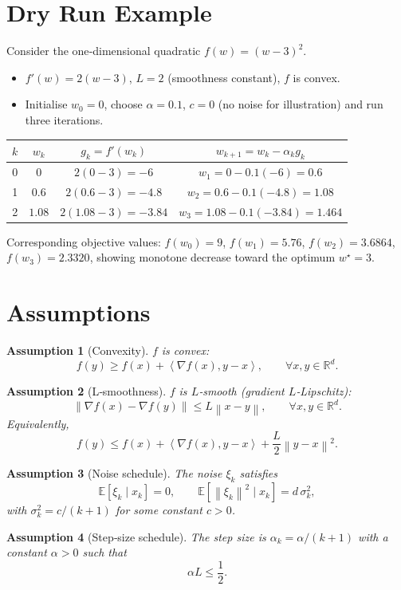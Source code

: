 \documentclass{article}
\newtheorem{assumption}{Assumption}
\newcommand{\E}{\mathbb{E}}
\newcommand{\R}{\mathbb{R}}
\newcommand{\norm}[1]{\left\lVert #1\right\rVert}
\newcommand{\ip}[2]{\left\langle #1,#2\right\rangle}
\begin{document}
\section*{Dry Run Example}
Consider the one‑dimensional quadratic $f(w)=(w-3)^2$.
\begin{itemize}
\item $f'(w)=2(w-3)$, $L=2$ (smoothness constant), $f$ is convex.
\item Initialise $w_0=0$, choose $\alpha=0.1$, $c=0$ (no noise for illustration) and run three iterations.
\end{itemize}
\begin{center}
\begin{tabular}{c|c|c|c}
$k$ & $w_k$ & $g_k= f'(w_k)$ & $w_{k+1}=w_k-\alpha_k g_k$\\ \hline
0 & $0$ & $2(0-3)=-6$ & $w_1=0-0.1(-6)=0.6$ \\
1 & $0.6$ & $2(0.6-3)=-4.8$ & $w_2=0.6-0.1(-4.8)=1.08$ \\
2 & $1.08$ & $2(1.08-3)=-3.84$ & $w_3=1.08-0.1(-3.84)=1.464$ 
\end{tabular}
\end{center}
Corresponding objective values: $f(w_0)=9$, $f(w_1)=5.76$, $f(w_2)=3.6864$, $f(w_3)=2.3320$,
showing monotone decrease toward the optimum $w^\star=3$.

\newpage
\section*{Assumptions}
\begin{assumption}[Convexity]\label{as:conv}
$f$ is convex:
\[
f(y)\ge f(x)+\ip{\nabla f(x)}{y-x},\qquad\forall x,y\in\R^{d}.
\]
\end{assumption}
\begin{assumption}[L‑smoothness]\label{as:smooth}
$f$ is $L$‑smooth (gradient $L$‑Lipschitz):
\[
\norm{\nabla f(x)-\nabla f(y)}\le L\norm{x-y},\qquad\forall x,y\in\R^{d}.
\]
Equivalently,
\[
f(y)\le f(x)+\ip{\nabla f(x)}{y-x}+\frac{L}{2}\norm{y-x}^{2}.
\]
\end{assumption}
\begin{assumption}[Noise schedule]\label{as:noise}
The noise $\xi_k$ satisfies
\[
\E[\xi_k\mid x_k]=0,\qquad 
\E[\norm{\xi_k}^{2}\mid x_k]=d\,\sigma_k^{2},
\]
with $\sigma_k^{2}=c/(k+1)$ for some constant $c>0$.
\end{assumption}
\begin{assumption}[Step‑size schedule]\label{as:step}
The step size is $\alpha_k=\alpha/(k+1)$ with a constant $\alpha>0$ such that 
\[
\alpha L\le \frac12 .
\tag{A}
\]
\end{assumption}
\end{document}
